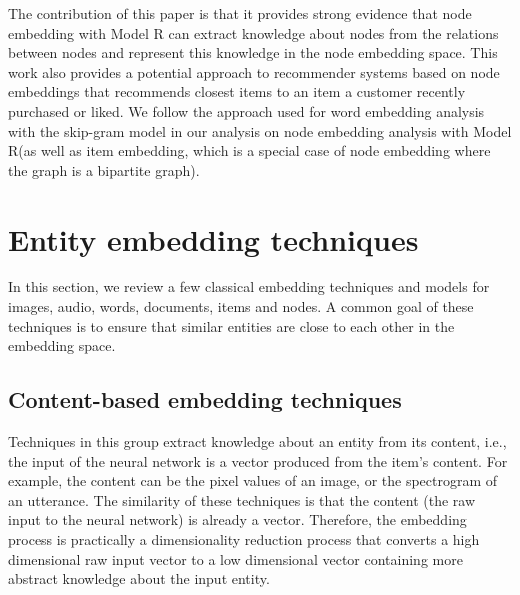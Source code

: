 \documentclass[conference]{IEEEtran}
\begin{document}
The contribution of this paper is that it provides strong evidence that node embedding with Model R can extract knowledge about nodes from the relations between nodes and represent this knowledge in the node embedding space.
This work also provides a potential approach to recommender systems based on node embeddings that recommends closest items to an item a customer recently purchased or liked.
We follow the approach used for word embedding analysis with the skip-gram model in our analysis on node embedding analysis with Model R(as well as item embedding, which is a special case of node embedding where the graph is a bipartite graph).

\section{Entity embedding techniques}
In this section, we review a few classical embedding techniques and models for images, audio, words, documents, items and nodes.
A common goal of these techniques is to ensure that
similar entities are close to each other in the embedding space.

\subsection{Content-based embedding techniques}
Techniques in this group extract knowledge about an entity from its content, 
i.e., the input of the neural network is a vector produced from the item's content.
For example, the content can be the pixel values of an image, or the spectrogram of an utterance.
The similarity of these techniques is that the content (the raw input to the neural network) is already a vector.
Therefore, the embedding process is practically a dimensionality reduction process
that converts a high dimensional raw input vector to a low dimensional vector 
containing more abstract knowledge about the input entity.
\end{document}
